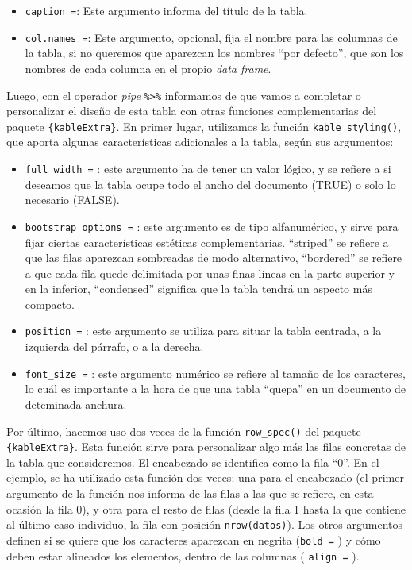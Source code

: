 \documentclass[
]{book}
\begin{document}
\begin{itemize}
\item
  \texttt{caption\ =}: Este argumento informa del título de la tabla.
\item
  \texttt{col.names\ =}: Este argumento, opcional, fija el nombre para las columnas de la tabla, si no queremos que aparezcan los nombres ``por defecto'', que son los nombres de cada columna en el propio \emph{data frame}.
\end{itemize}

Luego, con el operador \emph{pipe} \texttt{\%\textgreater{}\%} informamos de que vamos a completar o personalizar el diseño de esta tabla con otras funciones complementarias del paquete \texttt{\{kableExtra\}}.
En primer lugar, utilizamos la función \texttt{kable\_styling()}, que aporta algunas características adicionales a la tabla, según sus argumentos:

\begin{itemize}
\item
  \texttt{full\_width\ =} : este argumento ha de tener un valor lógico, y se refiere a si deseamos que la tabla ocupe todo el ancho del documento (TRUE) o solo lo necesario (FALSE).
\item
  \texttt{bootstrap\_options\ =} : este argumento es de tipo alfanumérico, y sirve para fijar ciertas características estéticas complementarias.
  ``striped'' se refiere a que las filas aparezcan sombreadas de modo alternativo, ``bordered'' se refiere a que cada fila quede delimitada por unas finas líneas en la parte superior y en la inferior, ``condensed'' significa que la tabla tendrá un aspecto más compacto.
\item
  \texttt{position\ =} : este argumento se utiliza para situar la tabla centrada, a la izquierda del párrafo, o a la derecha.
\item
  \texttt{font\_size\ =} : este argumento numérico se refiere al tamaño de los caracteres, lo cuál es importante a la hora de que una tabla ``quepa'' en un documento de deteminada anchura.
\end{itemize}

Por último, hacemos uso dos veces de la función \texttt{row\_spec()} del paquete \texttt{\{kableExtra\}}.
Esta función sirve para personalizar algo más las filas concretas de la tabla que consideremos.
El encabezado se identifica como la fila ``0''.
En el ejemplo, se ha utilizado esta función dos veces: una para el encabezado (el primer argumento de la función nos informa de las filas a las que se refiere, en esta ocasión la fila 0), y otra para el resto de filas (desde la fila 1 hasta la que contiene al último caso individuo, la fila con posición \texttt{nrow(datos)}).
Los otros argumentos definen si se quiere que los caracteres aparezcan en negrita (\texttt{bold\ =} ) y cómo deben estar alineados los elementos, dentro de las columnas ( \texttt{align\ =} ).
\end{document}

